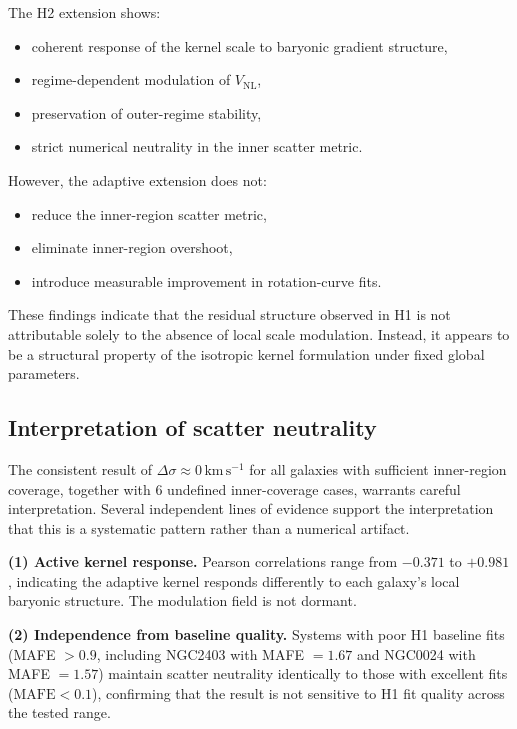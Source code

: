 \documentclass{aa}
\begin{document}
	The H2 extension shows:
	\begin{itemize}
		\item coherent response of the kernel scale to baryonic gradient structure,
		\item regime-dependent modulation of $V_{\mathrm{NL}}$,
		\item preservation of outer-regime stability,
		\item strict numerical neutrality in the inner scatter metric.
	\end{itemize}
	
	However, the adaptive extension does not:
	\begin{itemize}
		\item reduce the inner-region scatter metric,
		\item eliminate inner-region overshoot,
		\item introduce measurable improvement in rotation-curve fits.
	\end{itemize}
	
	These findings indicate that the residual structure observed in H1 is not 
	attributable solely to the absence of local scale modulation. Instead, it 
	appears to be a structural property of the isotropic kernel formulation 
	under fixed global parameters.
	
	\subsection{Interpretation of scatter neutrality}

	The consistent result of $\Delta\sigma \approx 0\,\mathrm{km\,s^{-1}}$
	for all galaxies with sufficient inner-region coverage, together with
	6 undefined inner-coverage cases, warrants careful interpretation.
	Several independent lines of evidence support the interpretation that this is a systematic pattern rather than a numerical artifact.

	\textbf{(1) Active kernel response.} Pearson correlations range from
	$-0.371$ to $+0.981$, indicating the adaptive kernel responds
	differently to each galaxy's local baryonic structure. The modulation
	field is not dormant.

	\textbf{(2) Independence from baseline quality.} Systems with poor H1
	baseline fits (MAFE $> 0.9$, including NGC2403 with MAFE $= 1.67$ and
	NGC0024 with MAFE $= 1.57$) maintain scatter neutrality identically to
	those with excellent fits ($\mathrm{MAFE} < 0.1$), confirming that the
	result is not sensitive to H1 fit quality across the tested range.
\end{document}
